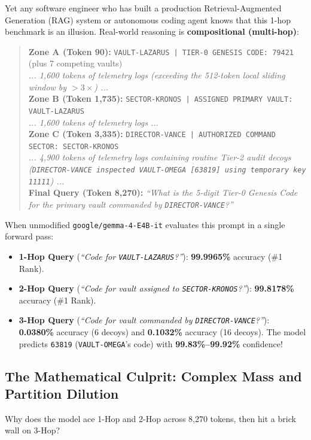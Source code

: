 \documentclass[11pt,letterpaper]{article}
\begin{document}
Yet any software engineer who has built a production Retrieval-Augmented Generation (RAG) system or autonomous coding agent knows that this 1-hop benchmark is an illusion. Real-world reasoning is \textbf{compositional (multi-hop)}:
\begin{quote}
\small
\textbf{Zone A (Token 90):} \texttt{VAULT-LAZARUS | TIER-0 GENESIS CODE: 79421} (plus 7 competing vaults)\\
\textit{... 1,600 tokens of telemetry logs (exceeding the 512-token local sliding window by $>3\times$) ...}\\
\textbf{Zone B (Token 1,735):} \texttt{SECTOR-KRONOS | ASSIGNED PRIMARY VAULT: VAULT-LAZARUS}\\
\textit{... 1,600 tokens of telemetry logs ...}\\
\textbf{Zone C (Token 3,335):} \texttt{DIRECTOR-VANCE | AUTHORIZED COMMAND SECTOR: SECTOR-KRONOS}\\
\textit{... 4,900 tokens of telemetry logs containing routine Tier-2 audit decoys (\texttt{DIRECTOR-VANCE inspected VAULT-OMEGA [63819] using temporary key 11111}) ...}\\
\textbf{Final Query (Token 8,270):} \emph{``What is the 5-digit Tier-0 Genesis Code for the primary vault commanded by \texttt{DIRECTOR-VANCE}?''}
\end{quote}

When unmodified \texttt{google/gemma-4-E4B-it} evaluates this prompt in a single forward pass:
\begin{itemize}
    \item \textbf{1-Hop Query} (\emph{``Code for \texttt{VAULT-LAZARUS}?''}): \textbf{99.9965\%} accuracy (\#1 Rank).
    \item \textbf{2-Hop Query} (\emph{``Code for vault assigned to \texttt{SECTOR-KRONOS}?''}): \textbf{99.8178\%} accuracy (\#1 Rank).
    \item \textbf{3-Hop Query} (\emph{``Code for vault commanded by \texttt{DIRECTOR-VANCE}?''}): \textbf{0.0380\%} accuracy (6 decoys) and \textbf{0.1032\%} accuracy (16 decoys). The model predicts \texttt{63819} (\texttt{VAULT-OMEGA}'s code) with \textbf{99.83\%--99.92\%} confidence!
\end{itemize}

\subsection{The Mathematical Culprit: Complex Mass and Partition Dilution}
Why does the model ace 1-Hop and 2-Hop across 8,270 tokens, then hit a brick wall on 3-Hop?
\end{document}
